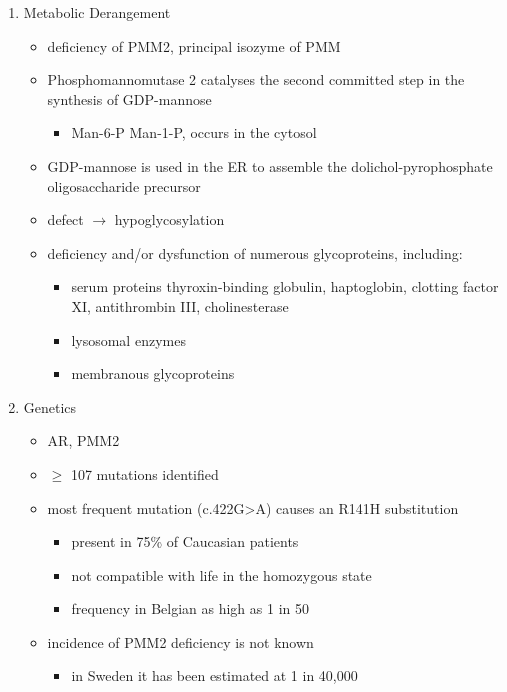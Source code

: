 \documentclass{scrartcl}
\begin{document}
\begin{enumerate}
\item Metabolic Derangement
\label{sec:orgcd6e978}
\begin{itemize}
\item deficiency of PMM2, principal isozyme of PMM
\item Phosphomannomutase 2 catalyses the second committed step in the synthesis of GDP-mannose
\begin{itemize}
\item Man-6-P \ce{<=>} Man-1-P, occurs in the cytosol
\end{itemize}
\item GDP-mannose is used in the ER to assemble the dolichol-pyrophosphate
oligosaccharide precursor
\item defect \(\to\) hypoglycosylation
\item deficiency and/or dysfunction of numerous glycoproteins, including:
\begin{itemize}
\item serum proteins thyroxin-binding globulin, haptoglobin, clotting
factor XI, antithrombin III, cholinesterase
\item lysosomal enzymes
\item membranous glycoproteins
\end{itemize}
\end{itemize}

\item Genetics
\label{sec:org79738a7}
\begin{itemize}
\item AR, PMM2
\item \(\ge\) 107 mutations identified
\item most frequent mutation (c.422G>A) causes an R141H substitution
\begin{itemize}
\item present in 75\% of Caucasian patients
\item not compatible with life in the homozygous state
\item frequency in Belgian as high as 1 in 50
\end{itemize}
\item incidence of PMM2 deficiency is not known
\begin{itemize}
\item in Sweden it has been estimated at 1 in 40,000
\end{itemize}
\end{itemize}


\end{enumerate}
\end{document}
